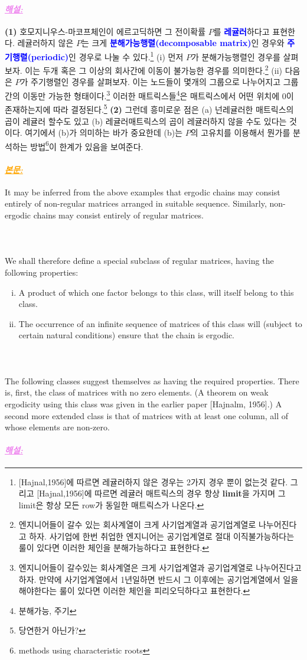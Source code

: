 \documentclass[12pt,oneside,english,a4paper]{article}
\def\bk{\paragraph{\LARGE$$}\LARGE}
\newcommand{\paraviolet}[1]{\paragraph{\LARGE\textcolor{violet}{\it\underline{\textbf{#1:}}}}\LARGE}
\newcommand{\paraorange}[1]{\paragraph{\LARGE\textcolor{orange}{\it\underline{\textbf{#1:}}}}\LARGE}
\begin{document}
\paraviolet{해설} {\bf (1)} 호모지니우스-마코프체인이 에르고딕하면 그 전이확률 $P$를 \textcolor{blue}{\bf 레귤러}하다고 표현한다. 레귤러하지 않은 $P$는 크게 \textcolor{blue}{\bf 분해가능행렬(decomposable matrix)}인 경우와 \textcolor{blue}{\bf 주기행렬(periodic)}인 경우로 나눌 수 있다.\footnote{[Hajnal,1956]에 따르면 레귤러하지 않은 경우는 2가지 경우 뿐이 없는것 같다. 그리고 [Hajnal,1956]에 따르면 레귤러 매트릭스의 경우 항상 {\bf limit}을 가지며 그 limit은 항상 모든 row가 동일한 매트릭스가 나온다.} (i) 먼저 $P$가 분해가능행렬인 경우를 살펴보자. 이는 두개 혹은 그 이상의 회사간에 이동이 불가능한 경우를 의미한다.\footnote{엔지니어들이 갈수 있는 회사계열이 크게 사기업계열과 공기업계열로 나누어진다고 하자. 사기업에 한번 취업한 엔지니어는 공기업계열로 절대 이직불가능하다는 룰이 있다면 이러한 체인을 분해가능하다고 표현한다.} (ii) 다음은 $P$가 주기행렬인 경우를 살펴보자. 이는 노드들이 몇개의 그룹으로 나누어지고 그룹간의 이동만 가능한 형태이다.\footnote{엔지니어들이 갈수있는 회사계열은 크게 사기업계열과 공기업계열로 나누어진다고 하자. 만약에 사기업계열에서 1년일하면 반드시 그 이후에는 공기업계열에서 일을 해야한다는 룰이 있다면 이러한 체인을 피리오딕하다고 표현한다.} 이러한 매트릭스들\footnote{분해가능, 주기}은 매트릭스에서 어떤 위치에 $0$이 존재하는지에 따라 결정된다.\footnote{당연한거 아닌가?} {\bf (2)} 그런데 흥미로운 점은 (a) 넌레귤러한 매트릭스의 곱이 레귤러 할수도 있고 (b) 레귤러매트릭스의 곱이 레귤러하지 않을 수도 있다는 것이다. 여기에서 (b)가 의미하는 바가 중요한데 (b)는 $P$의 고유치를 이용해서 뭔가를 분석하는 방법\footnote{methods using characteristic roots}이 한계가 있음을 보여준다. 

\paraorange{본문} 
It may be inferred from the above examples that ergodic chains may consist entirely of non-regular matrices arranged in suitable sequence. Similarly, non-ergodic chains may consist entirely of regular matrices. 

\bk We shall therefore define a special subclass of regular matrices, having the following properties:
\begin{enumerate}[(i)]
	\item A product of which one factor belongs to this class, will itself belong to this class.
	\item The occurrence of an infinite sequence of matrices of this class will (subject to certain natural conditions) ensure that the chain is ergodic.
\end{enumerate}
\bk The following classes suggest themselves as having the required properties. There is, first, the class of matrices with no zero elements. (A theorem on weak ergodicity using this class was given in the earlier paper [Hajnalm, 1956].) A second more extended class is that of matrices with at least one column, all of whose elements are non-zero.
\paraviolet{해설}
\end{document}
